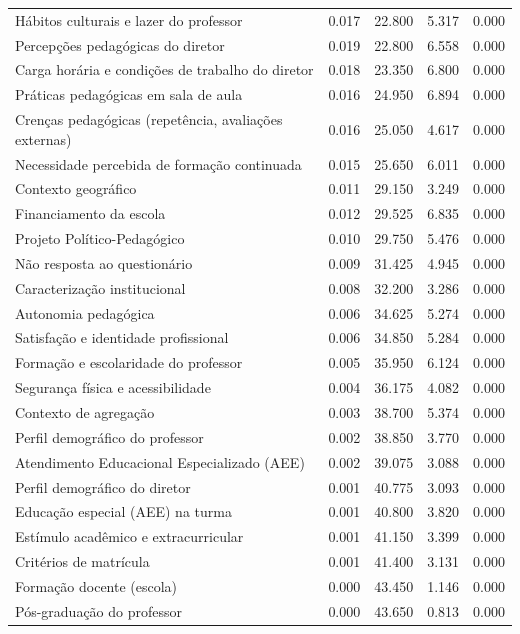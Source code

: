 \begin{tabular}{lrrrr}
Hábitos culturais e lazer do professor & 0.017 & 22.800 & 5.317 & 0.000 \\
Percepções pedagógicas do diretor & 0.019 & 22.800 & 6.558 & 0.000 \\
Carga horária e condições de trabalho do diretor & 0.018 & 23.350 & 6.800 & 0.000 \\
Práticas pedagógicas em sala de aula & 0.016 & 24.950 & 6.894 & 0.000 \\
Crenças pedagógicas (repetência, avaliações externas) & 0.016 & 25.050 & 4.617 & 0.000 \\
Necessidade percebida de formação continuada & 0.015 & 25.650 & 6.011 & 0.000 \\
Contexto geográfico & 0.011 & 29.150 & 3.249 & 0.000 \\
Financiamento da escola & 0.012 & 29.525 & 6.835 & 0.000 \\
Projeto Político-Pedagógico & 0.010 & 29.750 & 5.476 & 0.000 \\
Não resposta ao questionário & 0.009 & 31.425 & 4.945 & 0.000 \\
Caracterização institucional & 0.008 & 32.200 & 3.286 & 0.000 \\
Autonomia pedagógica & 0.006 & 34.625 & 5.274 & 0.000 \\
Satisfação e identidade profissional & 0.006 & 34.850 & 5.284 & 0.000 \\
Formação e escolaridade do professor & 0.005 & 35.950 & 6.124 & 0.000 \\
Segurança física e acessibilidade & 0.004 & 36.175 & 4.082 & 0.000 \\
Contexto de agregação & 0.003 & 38.700 & 5.374 & 0.000 \\
Perfil demográfico do professor & 0.002 & 38.850 & 3.770 & 0.000 \\
Atendimento Educacional Especializado (AEE) & 0.002 & 39.075 & 3.088 & 0.000 \\
Perfil demográfico do diretor & 0.001 & 40.775 & 3.093 & 0.000 \\
Educação especial (AEE) na turma & 0.001 & 40.800 & 3.820 & 0.000 \\
Estímulo acadêmico e extracurricular & 0.001 & 41.150 & 3.399 & 0.000 \\
Critérios de matrícula & 0.001 & 41.400 & 3.131 & 0.000 \\
Formação docente (escola) & 0.000 & 43.450 & 1.146 & 0.000 \\
Pós-graduação do professor & 0.000 & 43.650 & 0.813 & 0.000 \\
\bottomrule
\end{tabular}
